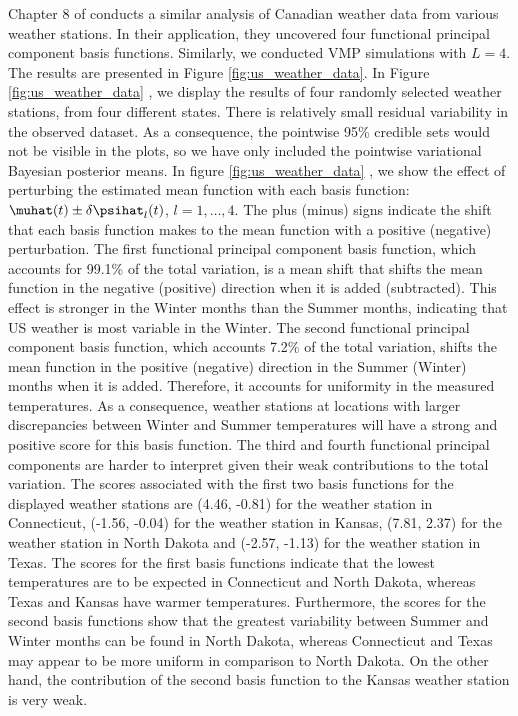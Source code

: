 \documentclass[12pt]{article}
\theoremstyle{plain}
\theoremstyle{definition}
\theoremstyle{remark}
\begin{document}
Chapter 8 of  conducts a similar analysis of Canadian weather data from various weather
stations. In their application, they uncovered four functional principal component basis functions.
Similarly, we conducted VMP simulations with $L = 4$.
The results are presented in Figure \ref{fig:us_weather_data}. In Figure \ref{fig:us_weather_data}
, we display the results of four randomly selected weather stations, from four different
states. There is relatively small residual variability in the observed dataset.
As a consequence, the pointwise 95\% credible sets would not be visible in the plots,
so we have only included the pointwise variational Bayesian posterior means.
In figure \ref{fig:us_weather_data} , we show
the effect of perturbing the estimated mean function with each basis function: $\muhat (t) \pm \delta \psihat_l (t)$,
$l = 1, \dots, 4$. The plus (minus) signs indicate the shift that each basis function makes to the mean function
with a positive (negative) perturbation.
The first functional principal component basis function, which accounts for 99.1\% of the total variation, is a mean shift
that shifts the mean function in the negative (positive) direction when it is added (subtracted).
This effect is stronger in the Winter months than the Summer months, indicating that
US weather is most variable in the Winter.
The second functional principal component basis function, which accounts 7.2\% of the total variation, shifts
the mean function in the positive (negative) direction in the Summer (Winter) months when it is added. Therefore,
it accounts for uniformity in the measured temperatures.
As a consequence, weather stations at locations with larger discrepancies
between Winter and Summer temperatures will have a strong and positive score for this basis function.
The third and fourth functional principal components are harder to interpret given their weak contributions to the
total variation. The scores associated with the first two basis functions for the displayed weather stations are
(4.46, -0.81) for the weather station in Connecticut, (-1.56, -0.04) for the weather station in Kansas, (7.81, 2.37)
for the weather station in North Dakota and (-2.57, -1.13) for the weather station in Texas.
The scores for the first basis functions indicate that the
lowest temperatures are to be expected in Connecticut and North Dakota, whereas Texas and Kansas have
warmer temperatures. Furthermore, the scores for the second basis functions show that the
greatest variability between Summer and Winter months can be found
in North Dakota, whereas Connecticut and Texas may appear to be more uniform in comparison to North Dakota.
On the other hand, the contribution of the second basis function to the Kansas weather station
is very weak.
\end{document}
